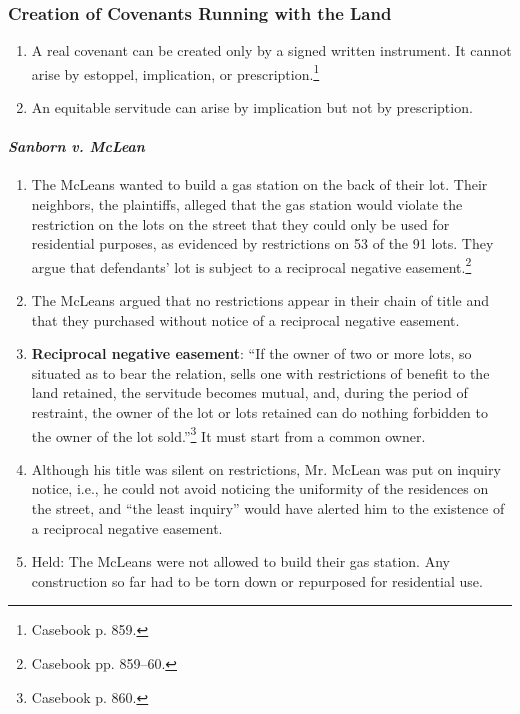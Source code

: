 \subsubsection{Creation of Covenants Running with the Land}

\begin{enumerate}
    \item A real covenant can be created only by a signed written instrument. 
    It cannot arise by estoppel, implication, or 
    prescription.\footnote{Casebook p. 859.}
    \item An equitable servitude can arise by implication but not by 
    prescription. %
\end{enumerate}

\paragraph{\emph{Sanborn v. McLean}}

\begin{enumerate}
    \item The McLeans wanted to build a gas station on the back of their lot. 
    Their neighbors, the plaintiffs, alleged that the gas station would 
    violate the restriction on the lots on the street that they could only be 
    used for residential purposes, as evidenced by restrictions on 53 of the 
    91 lots. They argue that defendants' lot is subject to a reciprocal 
    negative easement.\footnote{Casebook pp. 859--60.}
    \item The McLeans argued that no restrictions appear in their chain of 
    title and that they purchased without notice of a reciprocal negative 
    easement.
    \item \textbf{Reciprocal negative easement}: ``If the owner of two or more 
    lots, so situated as to bear the relation, sells one with restrictions of 
    benefit to the land retained, the servitude becomes mutual, and, during 
    the period of restraint, the owner of the lot or lots retained can do 
    nothing forbidden to the owner of the lot sold.''\footnote{Casebook p. 
    860.} It must start from a common owner.
    \item Although his title was silent on restrictions, Mr. McLean was put on 
    inquiry notice, i.e., he could not avoid noticing the uniformity of the 
    residences on the street, and ``the least inquiry'' would have alerted him 
    to the existence of a reciprocal negative easement.
    \item Held: The McLeans were not allowed to build their gas station. Any 
    construction so far had to be torn down or repurposed for residential use.
\end{enumerate}

